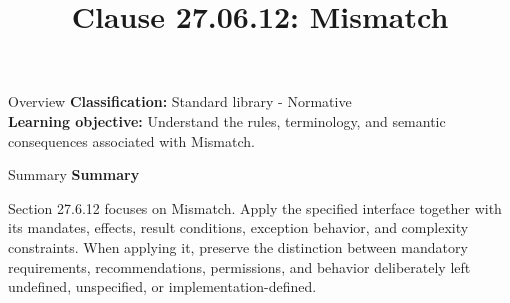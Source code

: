 \documentclass[10pt,letterpaper]{article}
\title{Clause 27.06.12: Mismatch}
\author{}
\date{}
\begin{document}
\maketitle
\begin{CornellOverviewBox}{Overview}
\textbf{Classification:} Standard library - Normative\\[2pt]
\textbf{Learning objective:} Understand the rules, terminology, and semantic consequences associated with Mismatch.
\end{CornellOverviewBox}\begin{CornellSummaryBox}{Summary}
{\sffamily\bfseries\color{Accent} Summary}\par\vspace{3pt}Section 27.6.12 focuses on Mismatch. Apply the specified interface together with its mandates, effects, result conditions, exception behavior, and complexity constraints. When applying it, preserve the distinction between mandatory requirements, recommendations, permissions, and behavior deliberately left undefined, unspecified, or implementation-defined.
\end{CornellSummaryBox}
\end{document}
